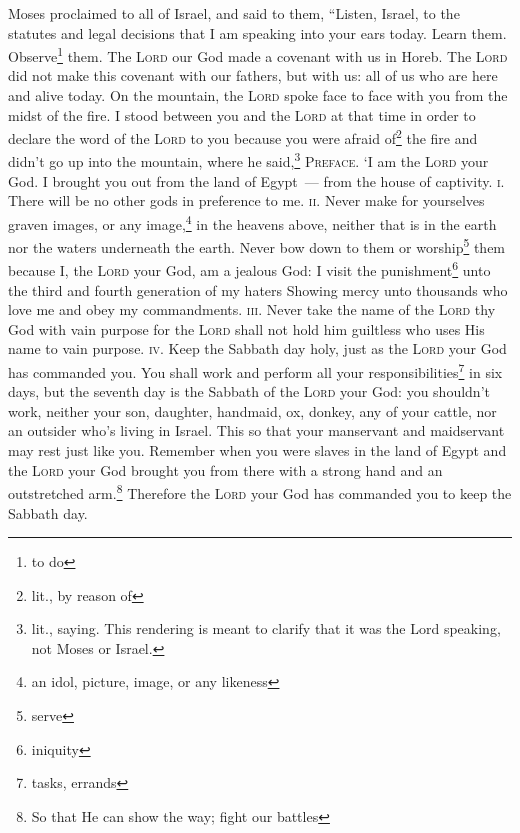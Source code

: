 
\begin{enumerate*}[mode=unboxed]
     Moses proclaimed to all of Israel, and said to them, ``Listen, Israel, to the statutes and legal decisions that I am speaking into your ears today. Learn them. Observe\footnote{to do} them.%
     The \textsc{Lord} our God made a covenant with us in Horeb.%
     The \textsc{Lord} did not make this covenant with our fathers, but with us: all of us who are here and alive today.%
     On the mountain, the \textsc{Lord} spoke face to face with you from the midst of the fire.%
     I stood between you and the \textsc{Lord} at that time in order to declare the word of the \textsc{Lord} to you because you were afraid of\footnote{lit., by reason of} the fire and didn't go up into the mountain, where he said,\footnote{lit., saying. This rendering is meant to clarify that it was the Lord speaking, not Moses or Israel.}%
     \textsc{Preface.} `I am the \textsc{Lord} your God. I brought you out from the land of Egypt~--- from the house of captivity.%
     \textsc{i.} There will be no other gods in preference to me.%
     \textsc{ii.} Never make for yourselves graven images, or any image,\footnote{an idol, picture, image, or any likeness} in the heavens above, neither that is in the earth nor the waters underneath the earth.%
     Never bow down to them or worship\footnote{serve} them because I, the \textsc{Lord} your God, am a jealous God: I visit the punishment\footnote{iniquity} unto the third and fourth generation of my haters%
     Showing mercy unto thousands who love me and obey my commandments.%
     \textsc{iii.} Never take the name of the \textsc{Lord} thy God with vain purpose for the \textsc{Lord} shall not hold him guiltless who uses His name to vain purpose.%
     \textsc{iv.} Keep the Sabbath day holy, just as the \textsc{Lord} your God has commanded you.%
     You shall work and perform all your responsibilities\footnote{tasks, errands} in six days,%
     but the seventh day is the Sabbath of the \textsc{Lord} your God: you shouldn't work, neither your son, daughter, handmaid, ox, donkey, any of your cattle, nor an outsider who's living in Israel. This so that your manservant and maidservant may rest just like you.%
     Remember when you were slaves in the land of Egypt and the \textsc{Lord} your God brought you from there with a strong hand and an outstretched arm.\footnote{So that He can show the way; fight our battles} Therefore the \textsc{Lord} your God has commanded you to keep the Sabbath day.%

\end{enumerate*}
